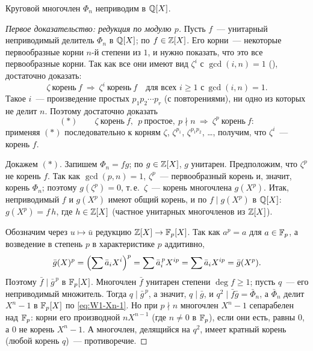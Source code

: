 \begin{theorem}[5.10]
Круговой многочлен $\Phi_n$ неприводим в $\mathbb Q[X]$.
\end{theorem}

\begin{proof}[Первое доказательство: редукция по модулю $p$]
Пусть $f$~--- унитарный неприводимый делитель $\Phi_n$ в $\mathbb Q[X]$; по  $f\in\mathbb Z[X]$. Его корни~--- некоторые
первообразные корни $n$-й степени из $1$, и нужно показать, что это все первообразные корни. Так как все они имеют вид
$\zeta^i$ с $\gcd(i,n)=1$ (), достаточно доказать:
\[
\zeta\ \text{корень}\ f\ \Longrightarrow\ \zeta^i\ \text{корень}\ f\quad\text{для всех $i\ge1$ с}\ \gcd(i,n)=1 .
\]
Такое $i$~--- произведение простых $p_1p_2\cdots p_r$ (с повторениями), ни одно из которых не делит $n$. Поэтому
достаточно доказать
\[
(\ast)\qquad \zeta\ \text{корень}\ f,\ \ p\ \text{простое},\ p\nmid n\ \Longrightarrow\ \zeta^p\ \text{корень}\ f:
\]
применяя $(\ast)$ последовательно к корням $\zeta$, $\zeta^{p_1}$, $\zeta^{p_1p_2}$, \dots, получим, что $\zeta^i$~--- корень $f$.

Докажем $(\ast)$. Запишем $\Phi_n=fg$; по  $g\in\mathbb Z[X]$, $g$ унитарен. Предположим, что $\zeta^p$ не корень $f$. Так
как $\gcd(p,n)=1$, $\zeta^p$~--- первообразный корень и, значит, корень $\Phi_n$; поэтому $g(\zeta^p)=0$, т.\,е.\ $\zeta$~---
корень многочлена $g(X^p)$. Итак, неприводимый $f$ и $g(X^p)$ имеют общий корень, и по  $f\mid g(X^p)$ в $\mathbb Q[X]$:
$g(X^p)=f\,h$, где $h\in\mathbb Z[X]$ (частное унитарных многочленов из $\mathbb Z[X]$).

Обозначим через $u\mapsto\bar u$ редукцию $\mathbb Z[X]\to\mathbb F_p[X]$. Так как $a^p=a$ для $a\in\mathbb F_p$, а возведение в степень $p$
в характеристике $p$ аддитивно,
\[
\bar g(X)^p=\Bigl(\sum\bar a_iX^i\Bigr)^p=\sum\bar a_i^{\,p}X^{ip}=\sum\bar a_iX^{ip}=\bar g(X^p).
\]
Поэтому $\bar f\mid\bar g^{\,p}$ в $\mathbb F_p[X]$. Многочлен $\bar f$ унитарен степени $\deg f\ge1$; пусть $q$~--- его неприводимый
множитель. Тогда $q\mid\bar g^{\,p}$, а значит, $q\mid\bar g$, и $q^2\mid\bar f\bar g=\bar\Phi_n$, а $\bar\Phi_n$ делит
$X^n-1$ в $\mathbb F_p[X]$ по \eqref{eq:W1-Xn-1}. Но при $p\nmid n$ многочлен $X^n-1$ сепарабелен над $\mathbb F_p$: корни его
производной $nX^{n-1}$ (где $n\ne0$ в $\mathbb F_p$), если они есть, равны $0$, а $0$ не корень $X^n-1$. А многочлен, делящийся на $q^2$, имеет
кратный корень (любой корень $q$)~--- противоречие.
\end{proof}

